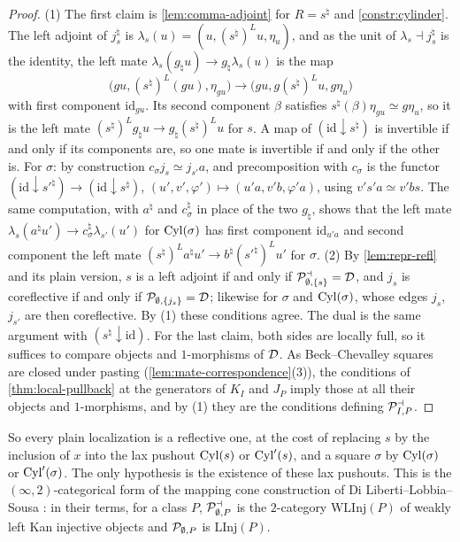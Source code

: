 \begin{proof}
%
(1) The first claim is \cref{lem:comma-adjoint} for $R = s^{\natural}$ and
\cref{constr:cylinder}. The left adjoint of $j_{s}^{\natural}$ is
$\lambda_{s}(u) = (u,(s^{\natural})^{L}u,\eta_{u})$,
and as the unit of
$\lambda_{s} \dashv j_{s}^{\natural}$
is the identity, the left mate
$\lambda_{s}(g_{\natural}u) \to g_{\natural}\lambda_{s}(u)$
is the map
\begin{equation*}
\bigl(gu,(s^{\natural})^{L}(gu),\eta_{gu}\bigr) \to
\bigl(gu,g(s^{\natural})^{L}u,g\eta_{u}\bigr)
\end{equation*}
with first component $\mathrm{id}_{gu}$. Its second component $\beta$ satisfies
$s^{\natural}(\beta)\eta_{gu} \simeq g\eta_{u}$,
so it is the left mate
$(s^{\natural})^{L}g_{\natural}u \to g_{\natural}(s^{\natural})^{L}u$
for $s$. A map of
$(\mathrm{id} \downarrow s^{\natural})$
is invertible if and only if its components are,
so one mate is invertible if and only if the other is.
For $\sigma$: by construction
$c_{\sigma}j_{s} \simeq j_{s'}a$,
and precomposition with $c_{\sigma}$ is the functor
$(\mathrm{id} \downarrow s'^{\natural}) \to (\mathrm{id} \downarrow
s^{\natural})$,
$(u',v',\varphi') \mapsto (u'a,v'b,\varphi'a)$,
using $v's'a \simeq v'bs$. The same computation, with $a^{\natural}$ and
$c_{\sigma}^{\natural}$
in place of the two $g_{\natural}$, shows that the left mate
$\lambda_{s}(a^{\natural}u') \to c_{\sigma}^{\natural}\lambda_{s'}(u')$
for $\mathrm{Cyl}(\sigma)$ has first component $\mathrm{id}_{u'a}$ and second component
the left mate
$(s^{\natural})^{L}a^{\natural}u' \to b^{\natural}(s'^{\natural})^{L}u'$
for $\sigma$.
(2) By \cref{lem:repr-refl} and its plain version,
$s$ is a left adjoint if and only if
$\mathcal{P}^{\dashv}_{\emptyset,\{s\}} = \mathcal{D}$,
and $j_{s}$ is coreflective if and only if
$\mathcal{P}_{\emptyset,\{j_{s}\}} = \mathcal{D}$;
likewise for $\sigma$ and $\mathrm{Cyl}(\sigma)$, whose edges $j_{s}$,
$j_{s'}$ are then coreflective. By (1) these conditions agree.
The dual is the same argument with
$(s^{\natural} \downarrow \mathrm{id})$.
For the last claim, both sides are locally full,
so it suffices to compare objects and $1$-morphisms of $\mathcal{D}$.
As Beck--Chevalley squares are closed under pasting
(\cref{lem:mate-correspondence}(3)), the conditions of \cref{thm:local-pullback}
at the generators of $K_{I}$ and $J_{P}$ imply those at all their objects and
$1$-morphisms, and by (1) they are the conditions defining $\mathcal{P}^{\dashv}_{I,P}$.
\end{proof}

%
So every plain localization is a reflective one,
at the cost of replacing $s$ by the inclusion of $x$ into the lax pushout
$\mathrm{Cyl}(s)$ or $\mathrm{Cyl}'(s)$, and a square $\sigma$ by $\mathrm{Cyl}(\sigma)$ or
$\mathrm{Cyl}'(\sigma)$. The only hypothesis is the existence of these lax pushouts.
This is the $(\infty,2)$-categorical form of the mapping cone construction of Di
Liberti--Lobbia--Sousa \cite[Proposition 1.14]{dilibertilobbiasousa2022kz}:
in their terms, for a class $P$,
$\mathcal{P}^{\dashv}_{\emptyset,P}$
is the $2$-category $\mathrm{WLInj}(P)$ of weakly left Kan injective objects and
$\mathcal{P}_{\emptyset,P}$ is $\mathrm{LInj}(P)$.

